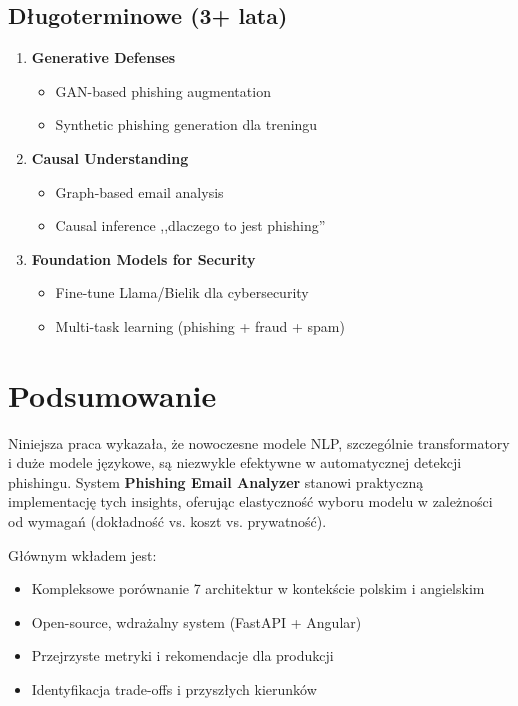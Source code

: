 \documentclass[11pt]{extreport}
\begin{document}
\subsection{Długoterminowe (3+ lata)}

\begin{enumerate}
    \item \textbf{Generative Defenses}
    \begin{itemize}
        \item GAN-based phishing augmentation
        \item Synthetic phishing generation dla treningu
    \end{itemize}
    
    \item \textbf{Causal Understanding}
    \begin{itemize}
        \item Graph-based email analysis
        \item Causal inference ,,dlaczego to jest phishing''
    \end{itemize}
    
    \item \textbf{Foundation Models for Security}
    \begin{itemize}
        \item Fine-tune Llama/Bielik dla cybersecurity
        \item Multi-task learning (phishing + fraud + spam)
    \end{itemize}
\end{enumerate}

\section{Podsumowanie}
\label{sec:podsumowanie}

Niniejsza praca wykazała, że nowoczesne modele NLP, szczególnie transformatory i duże modele językowe, są niezwykle efektywne w automatycznej detekcji phishingu. System \textbf{Phishing Email Analyzer} stanowi praktyczną implementację tych insights, oferując elastyczność wyboru modelu w zależności od wymagań (dokładność vs. koszt vs. prywatność).

Głównym wkładem jest:
\begin{itemize}
    \item Kompleksowe porównanie 7 architektur w kontekście polskim i angielskim
    \item Open-source, wdrażalny system (FastAPI + Angular)
    \item Przejrzyste metryki i rekomendacje dla produkcji
    \item Identyfikacja trade-offs i przyszłych kierunków
\end{itemize}
\end{document}
